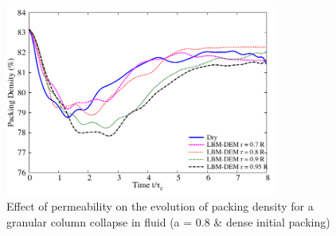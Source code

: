 \begin{figure}
	\centering
    \includegraphics[width=0.8\textwidth]{Packing_Density_a08_dense}
    \caption{Effect of permeability on the evolution of packing density for a 
    granular column collapse in fluid (a = 0.8 \& dense initial packing)}
    \label{fig:Packing_Density_a08_dense}
\end{figure}

